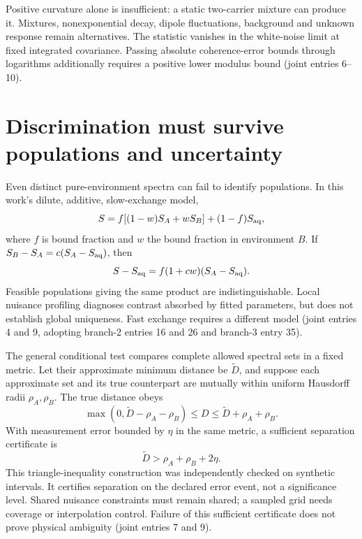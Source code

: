 \documentclass{article}
\begin{document}
Positive curvature alone is insufficient: a static two-carrier mixture can produce it. Mixtures, nonexponential decay, dipole fluctuations, background and unknown response remain alternatives. The statistic vanishes in the white-noise limit at fixed integrated covariance. Passing absolute coherence-error bounds through logarithms additionally requires a positive lower modulus bound (joint entries 6--10).

\section{Discrimination must survive populations and uncertainty}

Even distinct pure-environment spectra can fail to identify populations. In this work's dilute, additive, slow-exchange model,
\[
 S=f[(1-w)S_A+wS_B]+(1-f)S_{\rm aq},
\]
where \(f\) is bound fraction and \(w\) the bound fraction in environment \(B\). If \(S_B-S_A=c(S_A-S_{\rm aq})\), then
\[
 S-S_{\rm aq}=f(1+cw)(S_A-S_{\rm aq}).
\]
Feasible populations giving the same product are indistinguishable. Local nuisance profiling diagnoses contrast absorbed by fitted parameters, but does not establish global uniqueness. Fast exchange requires a different model (joint entries 4 and 9, adopting branch-2 entries 16 and 26 and branch-3 entry 35).

The general conditional test compares complete allowed spectral sets in a fixed metric. Let their approximate minimum distance be \(\widetilde D\), and suppose each approximate set and its true counterpart are mutually within uniform Hausdorff radii \(\rho_A,\rho_B\). The true distance obeys
\[
 \max(0,\widetilde D-\rho_A-\rho_B)
 \leq D\leq\widetilde D+\rho_A+\rho_B.
\]
With measurement error bounded by \(\eta\) in the same metric, a sufficient separation certificate is
\[
 \widetilde D>\rho_A+\rho_B+2\eta.
\]
This triangle-inequality construction was independently checked on synthetic intervals. It certifies separation on the declared error event, not a significance level. Shared nuisance constraints must remain shared; a sampled grid needs coverage or interpolation control. Failure of this sufficient certificate does not prove physical ambiguity (joint entries 7 and 9).
\end{document}
